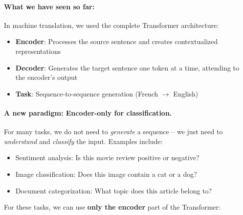 \documentclass{article}
\begin{document}
\paragraph{What we have seen so far:} In machine translation, we used the complete Transformer architecture:
\begin{itemize}
\item \textbf{Encoder}: Processes the source sentence and creates contextualized representations
\item \textbf{Decoder}: Generates the target sentence one token at a time, attending to the encoder's output
\item \textbf{Task}: Sequence-to-sequence generation (French $\rightarrow$ English)
\end{itemize}

\paragraph{A new paradigm: Encoder-only for classification.} For many tasks, we do not need to \textit{generate} a sequence -- we just need to \textit{understand} and \textit{classify} the input. Examples include:
\begin{itemize}
\item Sentiment analysis: Is this movie review positive or negative?
\item Image classification: Does this image contain a cat or a dog?
\item Document categorization: What topic does this article belong to?
\end{itemize}

For these tasks, we can use \textbf{only the encoder} part of the Transformer:
\end{document}
